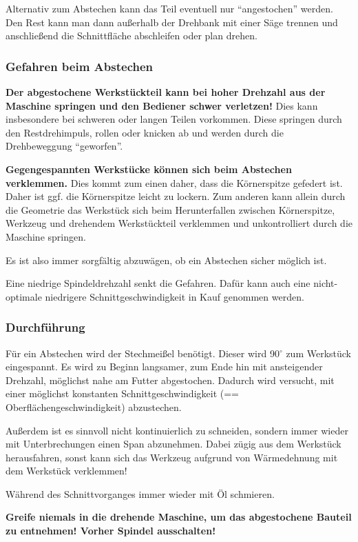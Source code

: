 \documentclass{\basedir/fablab-document}
\begin{document}
Alternativ zum Abstechen kann das Teil eventuell nur \enquote{angestochen} werden. Den Rest kann man dann außerhalb der Drehbank mit einer Säge trennen und anschließend die Schnittfläche abschleifen oder plan drehen.

\subsubsection{Gefahren beim Abstechen}
\textbf{Der abgestochene Werkstückteil kann bei hoher Drehzahl aus der Maschine springen und den Bediener schwer verletzen!} Dies kann insbesondere bei schweren oder langen Teilen vorkommen. Diese springen durch den Restdrehimpuls, rollen oder knicken ab und werden durch die Drehbeweggung \enquote{geworfen}.

\textbf{Gegengespannten Werkstücke können sich beim Abstechen verklemmen.} Dies kommt zum einen daher, dass die Körnerspitze gefedert ist. Daher ist ggf. die Körnerspitze leicht zu lockern. Zum anderen kann allein durch die Geometrie das Werkstück sich beim Herunterfallen zwischen Körnerspitze, Werkzeug und drehendem Werkstückteil verklemmen und unkontrolliert durch die Maschine springen.

Es ist also immer sorgfältig abzuwägen, ob ein Abstechen sicher möglich ist.

Eine niedrige Spindeldrehzahl senkt die Gefahren. Dafür kann auch eine nicht-optimale niedrigere Schnittgeschwindigkeit in Kauf genommen werden.


\subsubsection{Durchführung}
Für ein Abstechen wird der Stechmeißel benötigt. Dieser wird 90$^\circ$ zum Werkstück eingespannt.
Es wird zu Beginn langsamer, zum Ende hin mit ansteigender Drehzahl, möglichst nahe am Futter abgestochen. Dadurch wird versucht, mit einer möglichst konstanten Schnittgeschwindigkeit (== Oberflächengeschwindigkeit) abzustechen.

Außerdem ist es sinnvoll nicht kontinuierlich zu schneiden, sondern immer wieder mit Unterbrechungen einen Span abzunehmen.
Dabei zügig aus dem Werkstück herausfahren, sonst kann sich das Werkzeug aufgrund von Wärmedehnung mit dem Werkstück verklemmen!

Während des Schnittvorganges immer wieder mit Öl schmieren.

\textbf{Greife niemals in die drehende Maschine, um das abgestochene Bauteil zu entnehmen! Vorher Spindel ausschalten!}
\end{document}
